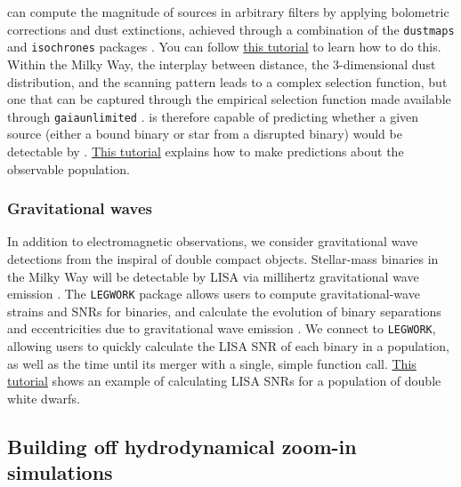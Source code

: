 \documentclass[twocolumn, twocolappendix, oneside]{aastex631}
\newcommand{\tutorialLink}[2]{\href{#1}{{\color{codecolour}#2}}}
\begin{document}
\cogsworth can compute the magnitude of sources in arbitrary filters by applying bolometric corrections and dust extinctions, achieved through a combination of the \texttt{dustmaps} and \texttt{isochrones} packages  \citep{2018JOSS....3..695M, Morton+2015:2015ascl.soft03010M}. You can follow \tutorialLink{https://cogsworth.readthedocs.io/en/latest/tutorials/observables/photometry.html}{this tutorial} to learn how to do this. Within the Milky Way, the interplay between distance, the 3-dimensional dust distribution, and the \gaia{} scanning pattern leads to a complex selection function, but one that can be captured through the empirical selection function made available through \texttt{gaiaunlimited} \citep{Cantat-Gaudin+2023:2023A&A...669A..55C}. \cogsworth is therefore capable of predicting whether a given source (either a bound binary or star from a disrupted binary) would be detectable by \gaia. \tutorialLink{https://cogsworth.readthedocs.io/en/latest/tutorials/observables/gaia.html}{This tutorial} explains how to make predictions about the observable \gaia population.

\subsubsection{Gravitational waves}

In addition to electromagnetic observations, we consider gravitational wave detections from the inspiral of double compact objects. Stellar-mass binaries in the Milky Way will be detectable by LISA via millihertz gravitational wave emission \citep{Amaro-Seoane+2017:2017arXiv170200786A}. The \texttt{LEGWORK} package allows users to compute gravitational-wave strains and SNRs for binaries, and calculate the evolution of binary separations and eccentricities due to gravitational wave emission \citep{LEGWORK_joss, LEGWORK_apjs}. We connect \cogsworth to \texttt{LEGWORK}, allowing users to quickly calculate the LISA SNR of each binary in a population, as well as the time until its merger with a single, simple function call. \tutorialLink{https://cogsworth.readthedocs.io/en/latest/tutorials/misc/lisa.html}{This tutorial} shows an example of calculating LISA SNRs for a \cogsworth population of double white dwarfs.

\subsection{Building off hydrodynamical zoom-in simulations}\label{sec:hydro_linking}
\end{document}
